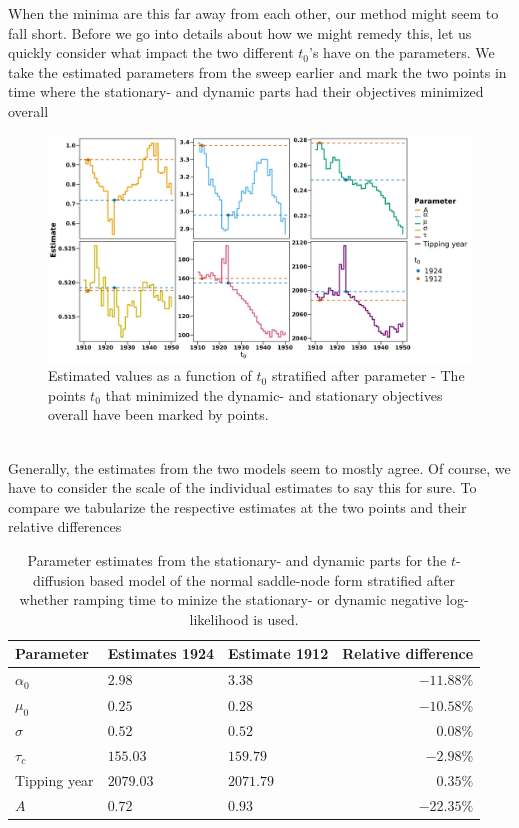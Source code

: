 When the minima are this far away from each other, our method might seem to fall short. Before we go into details about how we might remedy this, let us quickly consider what impact the two different $t_0$'s have on the parameters. We take the estimated parameters from the sweep earlier and mark the two points in time where the stationary- and dynamic parts had their objectives minimized overall
\begin{figure}[h!]
    \begin{center}
        \includegraphics[scale = .09]{figures/estimators_full_plot.jpeg}
        \caption{Estimated values as a function of $t_0$ stratified after parameter - The points $t_0$ that minimized the dynamic- and stationary objectives overall have been marked by points.}
    \end{center}
    \label{figure:AMOC_estimates_t_0}
\end{figure}\\
Generally, the estimates from the two models seem to mostly agree. Of course, we have to consider the scale of the individual estimates to say this for sure. To compare we tabularize the respective estimates at the two points and their relative differences
\begin{table}[h!]
    \centering
    \begin{tabular}{lllr}
     Parameter & Estimates 1924 & Estimate 1912 & Relative difference \\ \hline
    $\alpha_0$ & $2.98$ & 3$.38$ & $-11.88\%$ \\ 
      $\mu_0$ & $0.25$ & $0.28$ & $-10.58\%$ \\ 
      $\sigma$ & $0.52$ & $0.52$ & 0$.08\%$ \\ 
      $\tau_c$ & $155.03$ & $159.79$ & $-2.98\%$ \\ 
      Tipping year & $2079.03$ & $2071.79$ & $0.35\%$\\ 
      $A$ & $0.72$ & $0.93$ & $-22.35\%$ \\ 
       \hline
    \end{tabular}
    \caption{Parameter estimates from the stationary- and dynamic parts for the $t$-diffusion based model of the normal saddle-node form stratified after whether ramping time to minize the stationary- or dynamic negative log-likelihood is used.}
    \label{table:Estimates_t0_AMOC}
\end{table}\\
